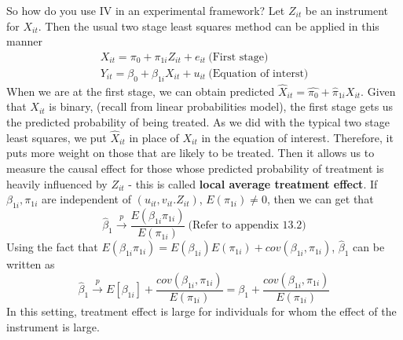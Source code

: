 So how do you use IV in an experimental framework? Let $Z_{it}$ be an instrument for $X_{it}$. Then the usual two stage least squares method can be applied in this manner
\begin{gather*}
X_{it} = \pi_0+\pi_{1i}Z_{it}+e_{it} \ \text{(First stage)}\\
Y_{it} = \beta_0+\beta_{1i}X_{it}+u_{it} \ \text{(Equation of interst)}
\end{gather*}
When we are at the first stage, we can obtain predicted $\hat{X}_{it}=\hat{\pi_0}+\hat{\pi}_{1i}X_{it}$. Given that $X_{it}$ is binary, (recall from linear probabilities model), the first stage gets us the predicted probability of being treated. As we did with the typical two stage least squares, we put $\hat{X}_{it}$ in place of $X_{it}$ in the equation of interest. Therefore, it puts more weight on those that are likely to be treated. Then it allows us to measure the causal effect for those whose predicted probability of treatment is heavily influenced by $Z_{it}$ - this is called \textbf{local average treatment effect}. If $\beta_{1i}, \pi_{1i}$ are independent of $(u_{it},v_{it}.Z_{it})$, $E(\pi_{1i})\neq0$, then we can get that
\[
\hat{\beta}_{1}\xrightarrow{p}\frac{E(\beta_{1i}\pi_{1i})}{E(\pi_{1i})} \ \text{(Refer to appendix 13.2)}
\]
Using the fact that $E(\beta_{1i}\pi_{1i})=E(\beta_{1i})E(\pi_{1i})+cov(\beta_{1i},\pi_{1i})$, $\hat{\beta}_1$ can be written as 
\[
\hat{\beta}_{1}\xrightarrow{p} E[\beta_{1i}]+\frac{cov(\beta_{1i},\pi_{1i})}{E(\pi_{1i})} = \beta_1+\frac{cov(\beta_{1i},\pi_{1i})}{E(\pi_{1i})}
\]
In this setting, treatment effect is large for individuals for whom the effect of the instrument is large.
\par\medskip

